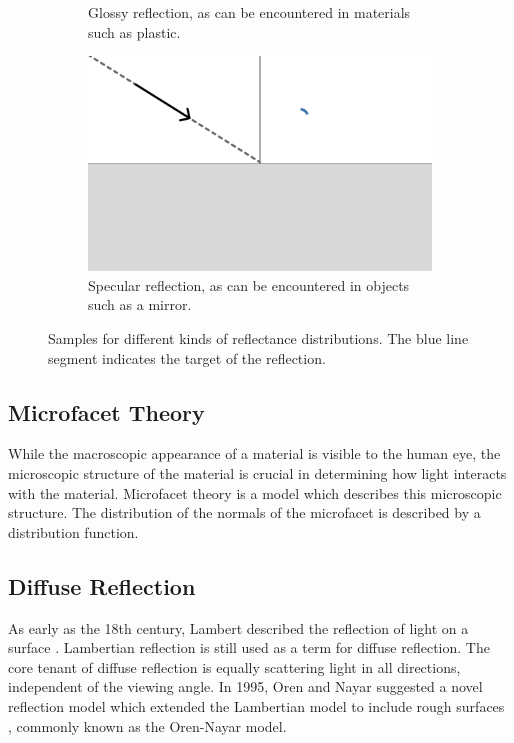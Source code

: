 \begin{figure}[H]
\begin{subfigure}[b]{0.45\textwidth}
    \caption{Glossy reflection, as can be encountered in materials such as plastic.}
    \label{fig:reflectionGlossy}
  \end{subfigure}
  \hfill
  \begin{subfigure}[b]{0.45\textwidth}
    \includegraphics[width=\textwidth]{resources/reflection-specular.png}
    \caption{Specular reflection, as can be encountered in objects such as a mirror.}
    \label{fig:reflectionSpecular}
  \end{subfigure}
  \caption{Samples for different kinds of reflectance distributions. The blue line segment indicates the target of the reflection. \cite{Pharr_Physically_Based_Rendering_2023}}
  \label{fig:brdf}
\end{figure}

\subsection{Microfacet Theory}

While the macroscopic appearance of a material is visible to the human eye, the microscopic structure of the material is crucial in determining how light interacts with the material. Microfacet theory is a model which describes this microscopic structure. The distribution of the normals of the microfacet is described by a distribution function.

\subsection{Diffuse Reflection}

As early as the 18th century, Lambert described the reflection of light on a surface \cite{lambert1760photometria}. Lambertian reflection is still used as a term for diffuse reflection. The core tenant of diffuse reflection is equally scattering light in all directions, independent of the viewing angle. In 1995, Oren and Nayar suggested a novel reflection model which extended the Lambertian model to include rough surfaces \cite{oren1994generalization}, commonly known as the Oren-Nayar model.

